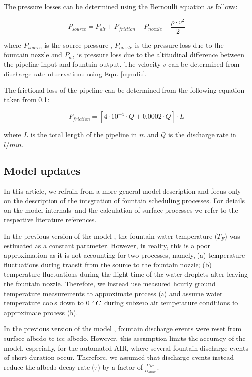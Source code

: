 \documentclass[tc, manuscript]{copernicus}
\begin{document}
The pressure losses can be determined using the Bernoulli equation as follows:

\begin{equation}
  \label{eqn:pressure}
  P_{source} = P_{alt} + P_{friction} + P_{nozzle} + \frac{\rho \cdot v^2}{2}
\end{equation}

where $P_{source}$ is the source pressure , $P_{nozzle}$ is the pressure loss due to the fountain nozzle and
$P_{alt}$ is pressure loss due to the altitudinal difference between the pipeline input and fountain
output. The velocity $v$ can be determined from discharge rate observations using Eqn. \ref{eqn:dis}. 

The frictional loss of the pipeline can be determined from the following equation taken from \ref{}:  

\begin{equation}
  \label{eqn:friction}
  P_{friction} = [4 \cdot 10 ^{-5} \cdot Q + 0.0002 \cdot Q] \cdot L
\end{equation}

where $L$ is the total length of the pipeline in $m$ and $Q$ is the discharge rate in $l/min$.


\subsection{Model updates}

In this article, we refrain from a more general model description and focus only on the
description of the integration of fountain scheduling processes. For details on the model internals, and the
calculation of surface processes we refer to the respective literature references. 

In the previous version of the model \citep{balasubramanianInfluenceMeteorologicalConditions2022}, the fountain
water temperature ($T_F$) was estimated as a constant parameter. However, in reality, this is a poor
approximation as it is not accounting for two processes, namely, (a) temperature fluctuations during transit
from the source to the fountain nozzle; (b) temperature fluctuations during the flight time of the water
droplets after leaving the fountain nozzle. Therefore, we instead use measured hourly ground temperature
measurements to approximate process (a) and assume water temperature cools down to 0 $^{\circ}\,C$ during subzero
air temperature conditions to approximate process (b).

In the previous version of the model \citep{balasubramanianInfluenceMeteorologicalConditions2022}, fountain
discharge events were reset from surface albedo to ice albedo. However, this assumption limits the accuracy of
the model, especially, for the automated AIR, where several fountain discharge events of short duration occur.
Therefore, we assumed that discharge events instead reduce the albedo decay rate ($\tau$) by a 
factor of $\frac{\alpha_{ice}}{\alpha_{snow}}$.
\end{document}
